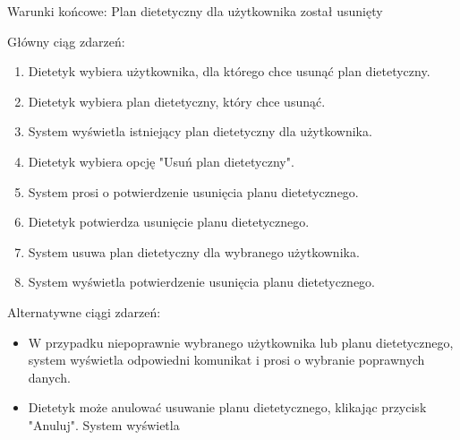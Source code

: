 {Warunki końcowe: Plan dietetyczny dla użytkownika został usunięty}

{Główny ciąg zdarzeń:}

\begin{enumerate}
\tightlist
\item
  {Dietetyk wybiera użytkownika, dla którego chce usunąć plan
  dietetyczny.}
\item
  {Dietetyk wybiera plan dietetyczny, który chce usunąć.}
\item
  {System wyświetla istniejący plan dietetyczny dla użytkownika.}
\item
  {Dietetyk wybiera opcję "Usuń plan dietetyczny".}
\item
  {System prosi o potwierdzenie usunięcia planu dietetycznego.}
\item
  {Dietetyk potwierdza usunięcie planu dietetycznego.}
\item
  {System usuwa plan dietetyczny dla wybranego użytkownika.}
\item
  {System wyświetla potwierdzenie usunięcia planu dietetycznego.}
\end{enumerate}

{Alternatywne ciągi zdarzeń:}

\begin{itemize}
\tightlist
\item
  {W przypadku niepoprawnie wybranego użytkownika lub planu
  dietetycznego, system wyświetla odpowiedni komunikat i prosi o
  wybranie poprawnych danych.}
\item
  {Dietetyk może anulować usuwanie planu dietetycznego, klikając
  przycisk "Anuluj". System wyświetla}
\end{itemize}
